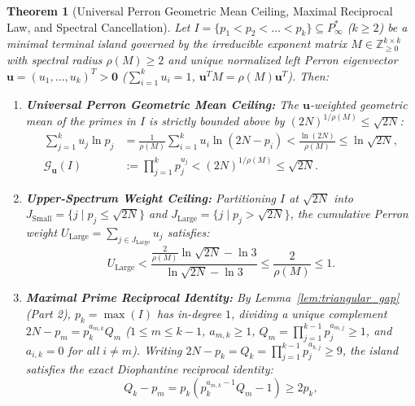 \documentclass[11pt,a4paper]{article}
\newtheorem{theorem}{Theorem}[section]
\theoremstyle{definition}
\begin{document}
\begin{theorem}[Universal Perron Geometric Mean Ceiling, Maximal Reciprocal Law, and Spectral Cancellation]
\label{thm:universal_spectral_laws}
Let $I = \{p_1 < p_2 < \dots < p_k\} \subseteq P^*_\infty$ ($k \ge 2$) be a minimal terminal island governed by the irreducible exponent matrix $M \in \mathbb{Z}_{\ge 0}^{k \times k}$ with spectral radius $\rho(M) \ge 2$ and unique normalized left Perron eigenvector $\mathbf{u} = (u_1, \dots, u_k)^T > \mathbf{0}$ ($\sum_{i=1}^k u_i = 1$, $\mathbf{u}^T M = \rho(M)\mathbf{u}^T$). Then:
\begin{enumerate}
    \item \textbf{Universal Perron Geometric Mean Ceiling:} The $\mathbf{u}$-weighted geometric mean of the primes in $I$ is strictly bounded above by $(2N)^{1/\rho(M)} \le \sqrt{2N}$:
    \begin{align}
    \label{eq:universal_geom_ceiling}
    \sum_{j=1}^k u_j \ln p_j &= \frac{1}{\rho(M)} \sum_{i=1}^k u_i \ln(2N - p_i) < \frac{\ln(2N)}{\rho(M)} \le \ln\sqrt{2N}, \\
    \label{eq:universal_geom_ceiling_mult}
    \mathcal{G}_{\mathbf{u}}(I) &:= \prod_{j=1}^k p_j^{u_j} < (2N)^{1/\rho(M)} \le \sqrt{2N}.
    \end{align}
    \item \textbf{Upper-Spectrum Weight Ceiling:} Partitioning $I$ at $\sqrt{2N}$ into $J_{\text{Small}} = \{j \mid p_j \le \sqrt{2N}\}$ and $J_{\text{Large}} = \{j \mid p_j > \sqrt{2N}\}$, the cumulative Perron weight $U_{\text{Large}} = \sum_{j \in J_{\text{Large}}} u_j$ satisfies:
    \begin{equation}
    \label{eq:universal_ularge_bound}
    U_{\text{Large}} < \frac{\frac{2}{\rho(M)}\ln\sqrt{2N} - \ln 3}{\ln\sqrt{2N} - \ln 3} \le \frac{2}{\rho(M)} \le 1.
    \end{equation}
    \item \textbf{Maximal Prime Reciprocal Identity:} By Lemma~\ref{lem:triangular_gap} (Part 2), $p_k = \max(I)$ has in-degree $1$, dividing a unique complement $2N - p_m = p_k^{a_{m,k}} Q_m$ ($1 \le m \le k-1$, $a_{m,k} \ge 1$, $Q_m = \prod_{j=1}^{k-1} p_j^{a_{m,j}} \ge 1$, and $a_{i,k} = 0$ for all $i \ne m$). Writing $2N - p_k = Q_k = \prod_{j=1}^{k-1} p_j^{a_{k,j}} \ge 9$, the island satisfies the exact Diophantine reciprocal identity:
    \begin{equation}
    \label{eq:universal_maximal_reciprocal}
    Q_k - p_m = p_k \left( p_k^{a_{m,k}-1} Q_m - 1 \right) \ge 2p_k,
    \end{equation}

\end{enumerate}
\end{theorem}
\end{document}
